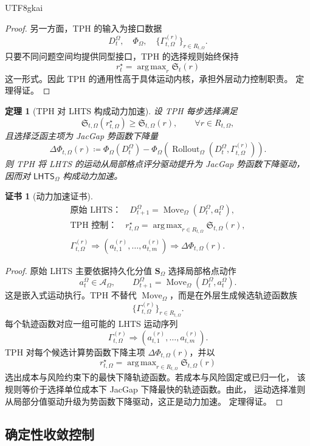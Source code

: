 \documentclass[12pt]{article}
\newtheorem{theorem}{定理}[section]
\newtheorem{Certificate}{证书}[section]
\newcommand{\LHTS}{\ensuremath{\mathsf{LHTS}}}
\newcommand{\DefEq}{\coloneqq}
\DeclareMathOperator{\Rollout}{Rollout}
\DeclareMathOperator{\Move}{Move}
\DeclareMathOperator*{\argmax}{arg\,max}
\begin{document}
\begin{CJK*}{UTF8}{gkai}
\begin{proof}
另一方面，TPH 的输入为接口数据
\[
D_t^\Omega,\quad
\Phi_\Omega,\quad
\{\Gamma_{t,\Omega}^{(r)}\}_{r\in R_{t,\Omega}}.
\]
只要不同问题空间均提供同型接口，TPH 的选择规则始终保持
\[
r_t^\star=\argmax_r\mathfrak S_t(r)
\]
这一形式。因此 TPH 的通用性高于具体运动内核，承担外层动力控制职责。
定理得证。
\end{proof}

\begin{theorem}[TPH 对 LHTS 构成动力加速]
设 TPH 每步选择满足
\[
\mathfrak S_{t,\Omega}(r_{t,\Omega}^\star)
\ge
\mathfrak S_{t,\Omega}(r),
\qquad
\forall r\in R_{t,\Omega},
\]
且选择泛函主项为 JacGap 势函数下降量
\[
\Delta\Phi_{t,\Omega}(r)
\DefEq
\Phi_\Omega(D_t^\Omega)
-
\Phi_\Omega\!\left(
\Rollout_\Omega(D_t^\Omega,\Gamma_{t,\Omega}^{(r)})
\right).
\]
则 TPH 将 LHTS 的运动从局部格点评分驱动提升为 JacGap 势函数下降驱动，
因而对 \(\LHTS_\Omega\) 构成动力加速。
\end{theorem}

\begin{Certificate}[动力加速证书]
\[
\boxed{
\begin{gathered}
\text{原始 LHTS：}\quad
D_{t+1}^\Omega=\Move_\Omega(D_t^\Omega,a_t^\Omega),
\\
\text{TPH 控制：}\quad
r_{t,\Omega}^\star
=
\argmax_{r\in R_{t,\Omega}}\mathfrak S_{t,\Omega}(r),
\\
\Gamma_{t,\Omega}^{(r)}
\Rightarrow
(a_{t,1}^{(r)},\ldots,a_{t,m}^{(r)})
\Rightarrow
\Delta\Phi_{t,\Omega}(r).
\end{gathered}
}
\]
\end{Certificate}

\begin{proof}
原始 LHTS 主要依据持久化分值 \(\mathbf S_\Omega\) 选择局部格点动作
\[
a_t^\Omega\in\mathcal A_\Omega,
\qquad
D_{t+1}^\Omega=\Move_\Omega(D_t^\Omega,a_t^\Omega).
\]
这是嵌入式运动执行。TPH 不替代 \(\Move_\Omega\)，而是在外层生成候选轨迹函数族
\[
\{\Gamma_{t,\Omega}^{(r)}\}_{r\in R_{t,\Omega}}.
\]
每个轨迹函数对应一组可能的 LHTS 运动序列
\[
\Gamma_{t,\Omega}^{(r)}
\Longrightarrow
(a_{t,1}^{(r)},\ldots,a_{t,m}^{(r)}).
\]
TPH 对每个候选计算势函数下降主项 \(\Delta\Phi_{t,\Omega}(r)\)，并以
\[
r_{t,\Omega}^\star
=
\argmax_{r\in R_{t,\Omega}}\mathfrak S_{t,\Omega}(r)
\]
选出成本与风险约束下的最快下降轨迹函数。若成本与风险固定或已归一化，
该规则等价于选择单位成本下 JacGap 下降最快的轨迹函数。由此，
运动选择准则从局部分值驱动升级为势函数下降驱动，这正是动力加速。
定理得证。
\end{proof}

\subsection{确定性收敛控制}
\label{subsec:tph-controls-lhts-convergence}


\end{CJK*}
\end{document}
